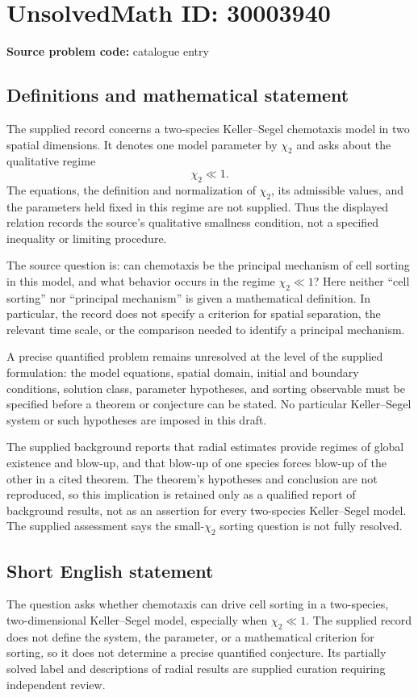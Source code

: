 \documentclass[11pt]{article}
\begin{document}
\section*{UnsolvedMath ID: 30003940}
\textbf{Source problem code:} catalogue entry
\subsection{Definitions and mathematical statement}
The supplied record concerns a two-species Keller--Segel chemotaxis model in two spatial dimensions. It denotes one model parameter by \(\chi_2\) and asks about the qualitative regime
\[
\chi_2\ll 1.
\]
The equations, the definition and normalization of \(\chi_2\), its admissible values, and the parameters held fixed in this regime are not supplied. Thus the displayed relation records the source's qualitative smallness condition, not a specified inequality or limiting procedure.

The source question is: can chemotaxis be the principal mechanism of cell sorting in this model, and what behavior occurs in the regime \(\chi_2\ll 1\)? Here neither ``cell sorting'' nor ``principal mechanism'' is given a mathematical definition. In particular, the record does not specify a criterion for spatial separation, the relevant time scale, or the comparison needed to identify a principal mechanism.

A precise quantified problem remains unresolved at the level of the supplied formulation: the model equations, spatial domain, initial and boundary conditions, solution class, parameter hypotheses, and sorting observable must be specified before a theorem or conjecture can be stated. No particular Keller--Segel system or such hypotheses are imposed in this draft.

The supplied background reports that radial estimates provide regimes of global existence and blow-up, and that blow-up of one species forces blow-up of the other in a cited theorem. The theorem's hypotheses and conclusion are not reproduced, so this implication is retained only as a qualified report of background results, not as an assertion for every two-species Keller--Segel model. The supplied assessment says the small-\(\chi_2\) sorting question is not fully resolved.
\subsection{Short English statement}
The question asks whether chemotaxis can drive cell sorting in a two-species, two-dimensional Keller--Segel model, especially when \(\chi_2\ll 1\). The supplied record does not define the system, the parameter, or a mathematical criterion for sorting, so it does not determine a precise quantified conjecture. Its partially solved label and descriptions of radial results are supplied curation requiring independent review.
\end{document}
